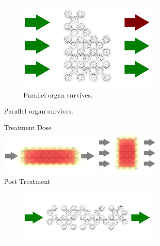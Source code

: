 \begin{figure}
\begin{subfigure}[b]{0.48\textwidth}
\begin{subfigure}[b]{0.35\textwidth}
			\includegraphics[width=\textwidth]{parallel_heat_point_post.pdf}
			\caption{Parallel organ survives.}
		\end{subfigure}	
	\end{subfigure}
	\vbar
	\begin{subfigure}[b]{0.48\textwidth}
		\caption{Irradiation of organs at risk with spread heat dose.}
		\label{fig:organ_radiation_square}
		\centering
		\vspace{3mm}
		\hspace{1.2cm}
		Treatment Dose
		\\
		\includegraphics[width=0.55\textwidth]{serial_heat_square.pdf}
		\vbar
		\includegraphics[width=0.35\textwidth]{parallel_heat_square.pdf}
		\\
		\hspace{1.1cm}
		Post Treatment
		\\
		\noindent
		\begin{subfigure}[b]{0.55\textwidth}
			\addtocounter{subfigure}{-1}
			\renewcommand\thesubfigure{\alph{subfigure}1}
			\centering
			\includegraphics[width=\textwidth]{serial_heat_square_post.pdf}

\end{subfigure}
\end{subfigure}
\end{figure}
